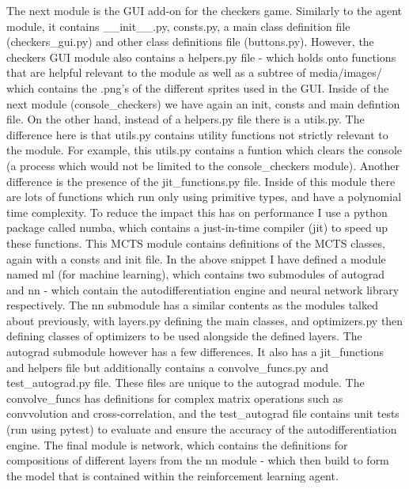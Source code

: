 \documentclass{article}
\begin{document}
    The next module is the GUI add-on for the checkers game. Similarly to the agent module, it contains \_\_init\_\_.py, consts.py, a main class definition file (checkers\_gui.py) and other class definitions file (buttons.py). 
    However, the checkers GUI module also contains a helpers.py file - which holds onto functions that are helpful relevant to the module as well as a subtree of media/images/ which contains the .png's of the different sprites used in the GUI.
    Inside of the next module (console\_checkers) we have again an init, consts and main defintion file. On the other hand, instead of a helpers.py file there is a utils.py. The difference here is that
    utils.py contains utility functions not strictly relevant to the module. For example, this utils.py contains a funtion which clears the console (a process which would not be limited to the console\_checkers module).
    Another difference is the presence of the jit_functions.py file. Inside of this module there are lots of functions which run only using primitive types, and have a polynomial time complexity. To reduce the impact this 
    has on performance I use a python package called numba, which contains a just-in-time compiler (jit) to speed up these functions.
    This MCTS module contains definitions of the MCTS classes, again with a consts and init file.
    In the above snippet I have defined a module named ml (for machine learning), which contains two submodules of autograd and nn - which contain the autodifferentiation engine and neural
    network library respectively. The nn submodule has a similar contents as the modules talked about previously, with layers.py defining the main classes, and optimizers.py then defining classes
    of optimizers to be used alongside the defined layers. The autograd submodule however has a few differences. It also has a jit_functions and helpers file but additionally contains a convolve_funcs.py and
    test_autograd.py file. These files are unique to the autograd module. The convolve_funcs has definitions for complex matrix operations such as convvolution and cross-correlation, and the test_autograd file
    contains unit tests (run using pytest) to evaluate and ensure the accuracy of the autodifferentiation engine.
    The final module is network, which contains the definitions for compositions of different layers from the nn module - which then build to form the model that is contained within the reinforcement
    learning agent.
\end{document}
